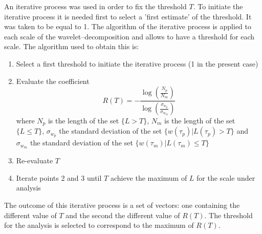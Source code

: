 An iterative process was used in order to fix the threshold $T$. To initiate the iterative process it is needed first to select a 'first estimate' of the threshold. It was taken to be equal to 1. The algorithm of the iterative process is applied to each scale of the wavelet--decomposition and allows to have a threshold for each scale. The algorithm used to obtain this is:
\begin{enumerate}
  \item Select a first threshold to initiate the iterative process (1 in the present case)
  \item Evaluate the coefficient
  \begin{equation}
    R(T) = -\frac{\log\left(\frac{N_p}{N_m}\right)}{\log\left(\frac{\sigma_{w_p}}{\sigma_{w_m}}\right)}
  \end{equation}
  where $N_p$ is the length of the set $\{L > T\}$, $N_m$ is the length of the set $\{L \leqslant T\}$, $\sigma_{w_p}$ the standard deviation of the set $\{w\left( \tau_p\right) | L\left( \tau_p \right) > T\}$ and $\sigma_{w_m}$ the standard deviation of the set $\{w\left( \tau_m\right) | L\left( \tau_m \right) \leqslant T\}$
  \item Re-evaluate $T$
  \item Iterate points 2 and 3 until $T$ achieve the maximum of $L$ for the scale under analysis
\end{enumerate}
The outcome of this iterative process is a set of vectors: one containing the different value of $T$ and the second the different value of $R(T)$. The threshold for the analysis is selected to correspond to the maximum of $R(T)$.

